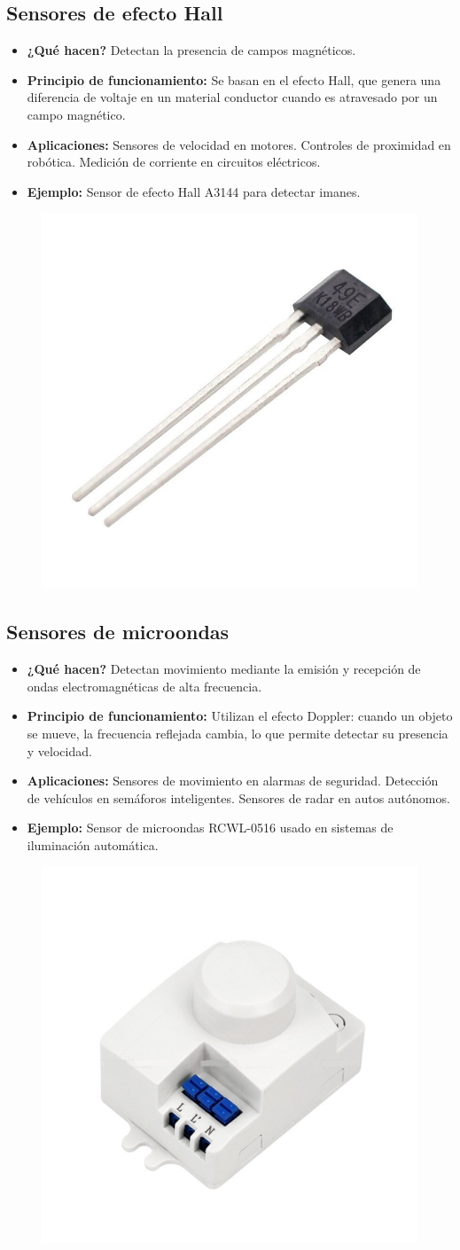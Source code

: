 \subsection*{Sensores de efecto Hall}
\begin{itemize}
	\item \textbf{¿Qué hacen?} Detectan la presencia de campos magnéticos.
	\item \textbf{Principio de funcionamiento:} Se basan en el efecto Hall, que genera una diferencia de voltaje en un material conductor cuando es atravesado por un campo magnético.
	\item \textbf{Aplicaciones:} Sensores de velocidad en motores.
	Controles de proximidad en robótica.
	Medición de corriente en circuitos eléctricos.
	\item \textbf{Ejemplo:} Sensor de efecto Hall A3144 para detectar imanes.
\end{itemize}
\begin{figure}[h]
	\centering
	\includegraphics[width=0.3\linewidth]{img/sensor de efecto hall}
	\label{fig:sensor de efecto hall}
\end{figure}
\subsection*{Sensores de microondas}
\begin{itemize}
	\item \textbf{¿Qué hacen?} Detectan movimiento mediante la emisión y recepción de ondas electromagnéticas de alta frecuencia.
	\item \textbf{Principio de funcionamiento:} Utilizan el efecto Doppler: cuando un objeto se mueve, la frecuencia reflejada cambia, lo que permite detectar su presencia y velocidad.
	\item \textbf{Aplicaciones:} Sensores de movimiento en alarmas de seguridad.
	Detección de vehículos en semáforos inteligentes.
	Sensores de radar en autos autónomos.
	\item \textbf{Ejemplo:} Sensor de microondas RCWL-0516 usado en sistemas de iluminación automática.
\end{itemize}
\begin{figure}[h]
	\centering
	\includegraphics[width=0.3\linewidth]{img/sensor de microondas}
	\label{fig:sensor de microondas}
\end{figure}
